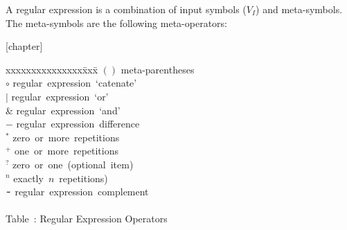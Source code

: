 A regular expression is a combination of input symbols ($V_I$) and
meta-symbols.  
The meta-symbols are the following meta-operators:
\vspace{2ex}

{}[chapter]
\setcounter{RegOps}{\value{table}}
\begin{samepage}
\begin{tabbing}
xxxxxxxxxxxxxxx\=xxx\=\kill
\>$()$                      \> \mbox{meta-parentheses}              \\
\>$\circ$                   \> \mbox{regular expression `catenate'} \\
\>$|$                       \> \mbox{regular expression `or'}       \\
\>\&                        \> \mbox{regular expression `and'}      \\
\>$-$                       \> \mbox{regular expression difference} \\
\>$^*$                      \> \mbox{zero or more repetitions}      \\
\>$^{\scriptscriptstyle+}$  \> \mbox{one or more repetitions}       \\
\>$^?$                      \> \mbox{zero or one (optional item)}   \\
\>$^n$                      \> \mbox{exactly $n$ repetitions)}      \\
\>$\tw$                     \> \mbox{regular expression complement} \\
\\
\>Table~\thetable: Regular Expression Operators

\end{tabbing}
\end{samepage}

